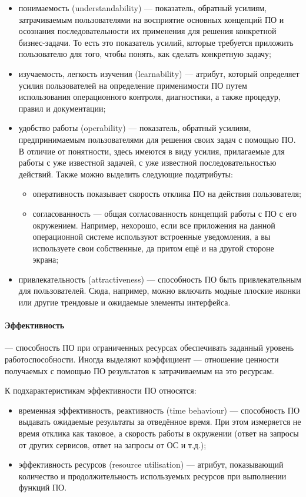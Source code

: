 \documentclass{../../text-style}
\begin{document}
\begin{itemize}
    \item понимаемость (understandability) --- показатель, обратный усилиям, затрачиваемым пользователями на восприятие основных концепций ПО и осознания последовательности их применения для решения конкретной бизнес-задачи. То есть это показатель усилий, которые требуется приложить пользователю для того, чтобы понять, как сделать конкретную задачу;
    \item изучаемость, легкость изучения (learnability) --- атрибут, который определяет усилия пользователей на определение применимости ПО путем использования операционного контроля, диагностики, а также процедур, правил и документации;
    \item удобство работы (operability) --- показатель, обратный усилиям, предпринимаемым пользователями для решения своих задач с помощью ПО. В отличие от понятности, здесь имеются в виду усилия, прилагаемые для работы с уже известной задачей, с уже известной последовательностью действий. Также можно выделить следующие податрибуты:
    \begin{itemize}
        \item оперативность показывает скорость отклика ПО на действия пользователя;
        \item согласованность --- общая согласованность концепций работы с ПО с его окружением. Например, нехорошо, если все приложения на данной операционной системе используют встроенные уведомления, а вы используете свои собственные, да притом ещё и на другой стороне экрана;
    \end{itemize}
    \item привлекательность (attractiveness) --- способность ПО быть привлекательным для пользователей. Сюда, например, можно включить модные плоские иконки или другие трендовые и ожидаемые элементы интерфейса.
\end{itemize}

\paragraph{Эффективность} --- способность ПО при ограниченных ресурсах обеспечивать заданный уровень работоспособности. Иногда выделяют коэффициент --- отношение ценности получаемых с помощью ПО результатов к затрачиваемым на это ресурсам.

К подхарактеристикам эффективности ПО относятся:

\begin{itemize}
    \item временная эффективность, реактивность (time behaviour) --- способность ПО выдавать ожидаемые результаты за отведённое время. При этом измеряется не время отклика как таковое, а скорость работы в окружении (ответ на запросы от других сервисов, ответ на запросы от ОС и т.д.);
    \item эффективность ресурсов (resource utilisation) --- атрибут, показывающий количество и продолжительность используемых ресурсов при выполнении функций ПО.
\end{itemize}
\end{document}
